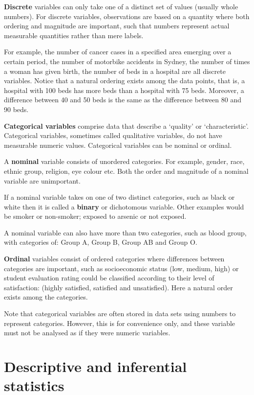 \documentclass[
  a4paper,
]{memoir}
\begin{document}
\textbf{Discrete} variables can only take one of a distinct set of
values (usually whole numbers). For discrete variables, observations are
based on a quantity where both ordering and magnitude are important,
such that numbers represent actual measurable quantities rather than
mere labels.

For example, the number of cancer cases in a specified area emerging
over a certain period, the number of motorbike accidents in Sydney, the
number of times a woman has given birth, the number of beds in a
hospital are all discrete variables. Notice that a natural ordering
exists among the data points, that is, a hospital with 100 beds has more
beds than a hospital with 75 beds. Moreover, a difference between 40 and
50 beds is the same as the difference between 80 and 90 beds.

\textbf{Categorical variables} comprise data that describe a `quality'
or `characteristic'. Categorical variables, sometimes called qualitative
variables, do not have measurable numeric values. Categorical variables
can be nominal or ordinal.

A \textbf{nominal} variable consists of unordered categories. For
example, gender, race, ethnic group, religion, eye colour etc. Both the
order and magnitude of a nominal variable are unimportant.

If a nominal variable takes on one of two distinct categories, such as
black or white then it is called a \textbf{binary} or dichotomous
variable. Other examples would be smoker or non-smoker; exposed to
arsenic or not exposed.

A nominal variable can also have more than two categories, such as blood
group, with categories of: Group A, Group B, Group AB and Group O.

\textbf{Ordinal} variables consist of ordered categories where
differences between categories are important, such as socioeconomic
status (low, medium, high) or student evaluation rating could be
classified according to their level of satisfaction: (highly satisfied,
satisfied and unsatisfied). Here a natural order exists among the
categories.

Note that categorical variables are often stored in data sets using
numbers to represent categories. However, this is for convenience only,
and these variable must not be analysed as if they were numeric
variables.

\section{Descriptive and inferential
statistics}\label{descriptive-and-inferential-statistics}
\end{document}
